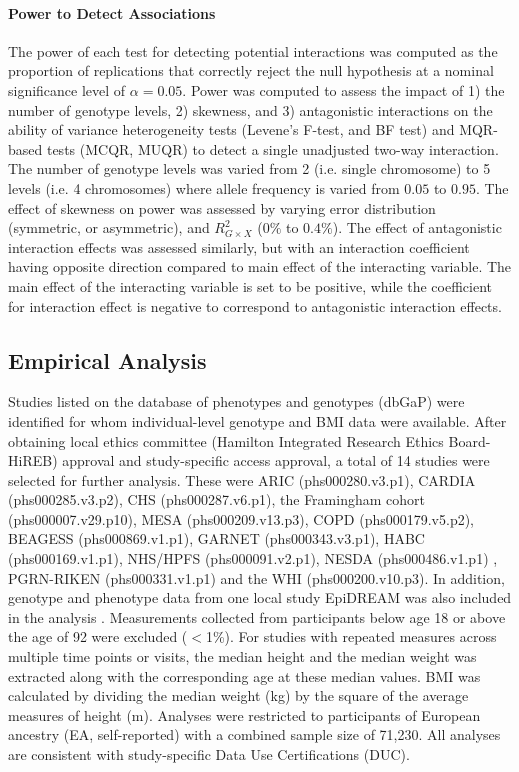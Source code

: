 \documentclass[12pt]{article}
\begin{document}
\paragraph{Power to Detect Associations}The power of each test for detecting potential interactions was computed as the proportion of replications that correctly reject the null hypothesis at a nominal significance level of $\alpha=0.05$. Power was computed to assess the impact of 1) the number of genotype levels, 2) skewness, and 3) antagonistic interactions on the ability of variance heterogeneity tests (Levene's F-test, and BF test) and MQR-based tests (MCQR, MUQR) to detect a single unadjusted two-way interaction. The number of genotype levels was varied from 2 (i.e. single chromosome) to 5 levels (i.e. 4 chromosomes) where allele frequency is varied from $0.05$ to $0.95$.  The effect of skewness on power was assessed by varying error distribution (symmetric, or asymmetric), and $R^{2}_{G \times X}$ ($0\%$ to $0.4\%$). The effect of antagonistic interaction effects was assessed similarly, but with an interaction coefficient having opposite direction compared to main effect of the interacting variable. The main effect of the interacting variable is set to be positive, while the coefficient for interaction effect is negative to correspond to antagonistic interaction effects.

\subsection{Empirical Analysis}
\indent \indent Studies listed on the database of phenotypes and genotypes (dbGaP) were identified for whom individual-level genotype and BMI data were available. After obtaining local ethics committee (Hamilton Integrated Research Ethics Board-HiREB) approval and study-specific access approval, a total of 14 studies were selected for further analysis. These were ARIC (phs000280.v3.p1), CARDIA (phs000285.v3.p2), CHS (phs000287.v6.p1), the Framingham cohort (phs000007.v29.p10), MESA (phs000209.v13.p3), COPD (phs000179.v5.p2), BEAGESS (phs000869.v1.p1), GARNET (phs000343.v3.p1), HABC (phs000169.v1.p1), NHS/HPFS (phs000091.v2.p1), NESDA (phs000486.v1.p1) , PGRN-RIKEN (phs000331.v1.p1) and the WHI (phs000200.v10.p3). In addition, genotype and phenotype data from one local study EpiDREAM was also included in the analysis \cite{Gerstein:2004ek}. Measurements collected from participants below age 18 or above the age of 92 were excluded ($<$1\%). For studies with repeated measures across multiple time points or visits, the median height and the median weight was extracted along with the corresponding age at these median values. BMI was calculated by dividing the median weight (kg) by the square of the average measures of height (m). Analyses were restricted to participants of European ancestry (EA, self-reported) with a combined sample size of 71,230. All analyses are consistent with study-specific Data Use Certifications (DUC).
\end{document}
